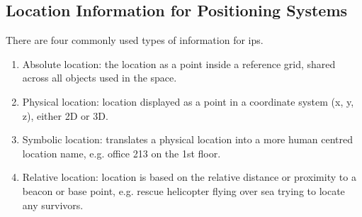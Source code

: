 \subsection{Location Information for Positioning Systems}
There are four commonly used types of information for \acrshort{ips}\cite{Liu2007}.
\begin{enumerate}
\item Absolute location: the location as a point inside a reference grid, shared across all objects used in the space.
\item Physical location: location displayed as a point in a coordinate system (x, y, z), either 2D or 3D.
\item Symbolic location: translates a physical location into a more human centred location name, e.g. office 213 on the 1st floor.
\item Relative location: location is based on the relative distance or proximity to a beacon or base point, e.g. rescue helicopter flying over sea trying to locate any survivors.
\end{enumerate}